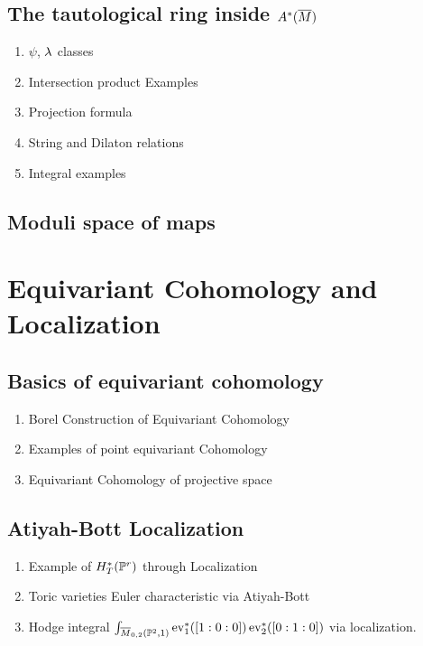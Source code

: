 \documentclass[12pt]{memoir}
\begin{document}
\section{The tautological ring inside $A^\ast(\overline{M})$}

\begin{enumerate}
    \item $\psi$, $\lambda$ classes
    \item Intersection product Examples
    \item Projection formula
    \item String and Dilaton relations
    \item Integral examples
\end{enumerate}

\section{Moduli space of maps}

\chapter{Equivariant Cohomology and Localization}

\section{Basics of equivariant cohomology}
\begin{enumerate}
    \item Borel Construction of Equivariant Cohomology
    \item Examples of point equivariant Cohomology
    \item Equivariant Cohomology of projective space
\end{enumerate}

\section{Atiyah-Bott Localization}

\begin{enumerate}
    \item Example of $H^\ast_T(\mathbb{P}^r)$ through Localization
    \item Toric varieties Euler characteristic via Atiyah-Bott
    \item Hodge integral $\int_{\overline M_{0,2}(\mathbb{P}^2,1)}\operatorname{ev}_1^\ast([1:0:0])\operatorname{ev}_2^\ast([0:1:0])$ via localization.
\end{enumerate}
\end{document}
